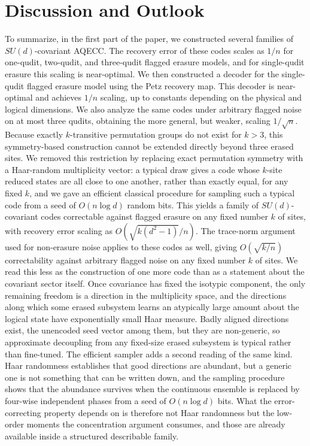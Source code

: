 \documentclass[10pt,twocolumn,superscriptaddress,aps,amsmath,amssymb,citeautoscript,floatfix,prx]{revtex4-2}
\theoremstyle{plain}
\theoremstyle{plain}
\theoremstyle{plain}
\theoremstyle{plain}
\theoremstyle{plain}
\theoremstyle{plain}
\theoremstyle{plain}
\theoremstyle{definition}
\theoremstyle{plain}
\begin{document}
\section{Discussion and Outlook}\label{sec:main_disc}

To summarize, in the first part of the paper, we constructed several families of \(SU(d)\)-covariant AQECC. The recovery error of these codes scales
as \(1/n\) for one-qudit, two-qudit, and three-qudit flagged erasure models, and for single-qudit erasure this scaling is near-optimal. 
We then constructed a decoder for the single-qudit flagged erasure model using the Petz recovery map. 
This decoder is near-optimal and achieves \(1/n\) scaling, up to constants depending on the physical and logical dimensions. We also analyze the same codes
under arbitrary flagged noise on at most three qudits, obtaining the more general, but weaker, scaling \(1/\sqrt n\). 
Because exactly $k$-transitive permutation groups do not exist for $k>3$, this symmetry-based construction cannot be extended directly beyond three erased sites. 
We removed this restriction by replacing exact permutation symmetry with a Haar-random multiplicity vector: a typical draw gives a code whose $k$-site reduced states are 
all close to one another, rather than exactly equal, for any fixed $k$, and we gave an efficient classical procedure for sampling such a typical code from a seed of $O(n\log d)$ 
random bits. This yields a family of \(SU(d)\)-covariant codes correctable against flagged erasure on any fixed number \(k\) of sites, with recovery error scaling as 
\(O(\sqrt{k(d^2-1)}/n)\). The trace-norm argument used for non-erasure noise applies to these codes as well, giving \(O(\sqrt{k/n})\) correctability against arbitrary 
flagged noise on any fixed number \(k\) of sites. We read this less as the construction of one more code than as a statement about the covariant sector itself. 
Once covariance has fixed the isotypic component, the only remaining freedom is a direction in the multiplicity space, and the directions along which some erased subsystem 
learns an atypically large amount about the logical state have exponentially small Haar measure. Badly aligned directions exist, the unencoded seed vector among them, 
but they are non-generic, so approximate decoupling from any fixed-size erased subsystem is typical rather than fine-tuned. 
The efficient sampler adds a second reading of the same kind. Haar randomness establishes that good directions are abundant, 
but a generic one is not something that can be written down, and the sampling procedure shows that the abundance survives when the continuous ensemble is replaced 
by four-wise independent phases from a seed of $O(n\log d)$ bits. What the error-correcting property depends on is therefore not Haar randomness but the low-order moments 
the concentration argument consumes, and those are already available inside a structured describable family.
\end{document}
